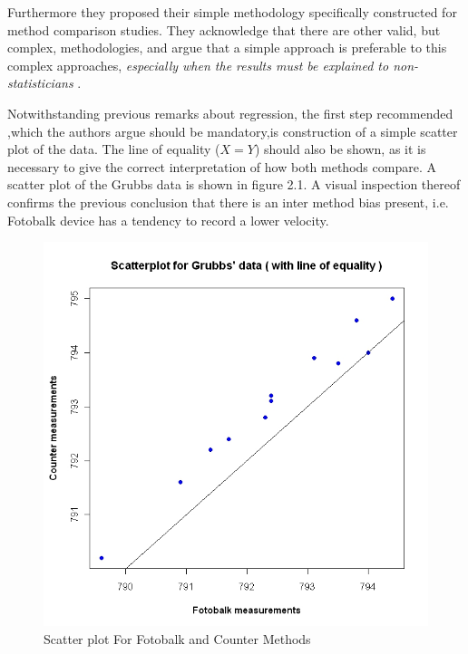 \documentclass[12pt, a4paper]{report}
\begin{document}
	
	Furthermore they proposed their simple methodology specifically
	constructed for method comparison studies. They acknowledge that
	there are other valid, but complex, methodologies, and argue that
	a simple approach is preferable to this complex approaches,
	\emph{especially when the results must be explained to
		non-statisticians} \citep*{BA83}.
	
	\smallskip
	
	Notwithstanding previous remarks about regression, the first step
	recommended ,which the authors argue should be mandatory,is
	construction of a simple scatter plot of the data. The line of
	equality ($X=Y$) should also be shown, as it is necessary to give
	the correct interpretation of how both methods compare. A scatter
	plot of the Grubbs data is shown in figure 2.1. A visual
	inspection thereof confirms the previous conclusion that there is
	an inter method bias present, i.e. Fotobalk device has a tendency
	to record a lower velocity.
	
	\begin{figure}[h!]
		\begin{center}
			\includegraphics[width=130mm]{images/GrubbsScatter.jpeg}
			\caption{Scatter plot For Fotobalk and Counter Methods}\label{GrubbsScatter}
		\end{center}
	\end{figure}
	
\end{document}
